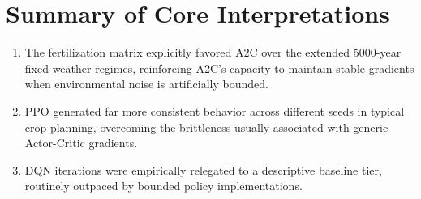 \section{Summary of Core Interpretations}
\begin{enumerate}
    \item The fertilization matrix explicitly favored A2C over the extended 5000-year fixed weather regimes, reinforcing A2C's capacity to maintain stable gradients when environmental noise is artificially bounded.
    \item PPO generated far more consistent behavior across different seeds in typical crop planning, overcoming the brittleness usually associated with generic Actor-Critic gradients.
    \item DQN iterations were empirically relegated to a descriptive baseline tier, routinely outpaced by bounded policy implementations.
\end{enumerate}
